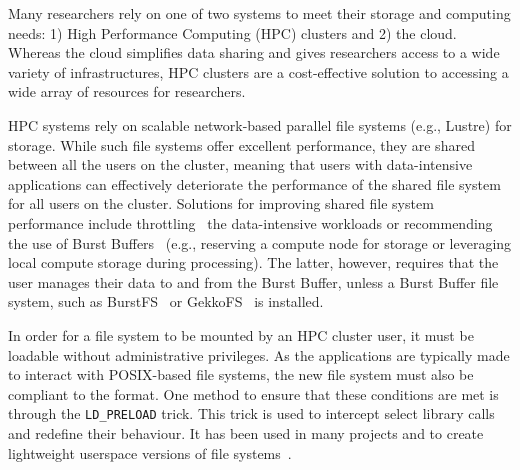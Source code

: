 \documentclass[fleqn,10pt]{wlscirep}
\begin{document}
    
    Many researchers rely on one of two systems to meet their storage and
    computing needs: 1) High Performance Computing (HPC) clusters and 2) the
    cloud. Whereas the cloud simplifies data sharing and gives researchers
    access to a wide variety of infrastructures, HPC clusters are a
    cost-effective solution to accessing a wide array of resources for
    researchers. %
    
    HPC systems rely on scalable network-based parallel file systems (e.g.,
    Lustre) for storage. While such file systems offer excellent performance,
    they are shared between all the users on the cluster, meaning that users
    with data-intensive applications can effectively deteriorate the performance
    of the shared file system for all users on the cluster. Solutions for
    improving shared file system performance include
    throttling~\cite{huang2020ooops} the data-intensive workloads or
    recommending the use of Burst Buffers~\cite{bb} (e.g., reserving a compute
    node for storage or leveraging local compute storage during processing). The
    latter, however, requires that the user manages their data to and from the
    Burst Buffer, unless a Burst Buffer file system, such as
    BurstFS~\cite{burstfs} or GekkoFS~\cite{gekkofs} is installed.
    
    In order for a file system to be mounted by an HPC cluster user, it must be
    loadable without administrative privileges. As the applications are
    typically made to interact with POSIX-based file systems, the new file
    system must also be compliant to the format. One method to ensure that these
    conditions are met is through the \texttt{LD\_PRELOAD} trick. This trick is
    used to intercept select library calls and redefine their behaviour. It has
    been used in many projects and to create lightweight userspace versions of
    file systems~\cite{xtreemfs,burstfs,gekkofs}. 
    
\end{document}
